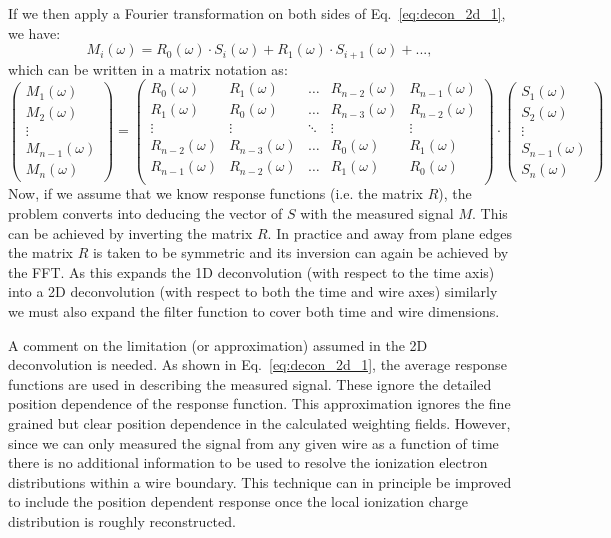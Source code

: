 If we then apply a Fourier transformation on both sides of Eq.~\ref{eq:decon_2d_1},
we have:
\begin{equation}\label{eq:decon_2d_2}
M_i(\omega) = R_0(\omega) \cdot S_i(\omega) + R_1(\omega) \cdot S_{i+1} (\omega) + ...,
\end{equation} 
which can be written in a matrix notation as:
\begin{equation}
\begin{pmatrix}
    M_1(\omega)\\
    M_2(\omega)\\
    \vdots\\
    M_{n-1}(\omega)\\
    M_{n}(\omega)
\end{pmatrix}
=
\begin{pmatrix}
R_0(\omega) & R_1(\omega) & \ldots & R_{n-2}(\omega) & R_{n-1}(\omega) \\
R_1(\omega) & R_0(\omega) & \ldots & R_{n-3}(\omega) & R_{n-2}(\omega) \\
    \vdots  & \vdots      & \ddots & \vdots          & \vdots \\
    R_{n-2}(\omega) & R_{n-3}(\omega) & \ldots & R_0(\omega) & R_1(\omega) \\
    R_{n-1}(\omega) & R_{n-2}(\omega) & \ldots & R_1(\omega) & R_0(\omega) \\
\end{pmatrix}
\cdot
\begin{pmatrix}
    S_1(\omega)\\
    S_2(\omega)\\
    \vdots\\
    S_{n-1}(\omega)\\
    S_{n}(\omega)
\end{pmatrix}
\label{eq:matrix_expansion}
\end{equation}
Now, if we assume that we know response functions (i.e. the matrix $R$), the 
problem converts into deducing the vector of $S$ with the measured signal $M$. 
%
This can be achieved by inverting the matrix $R$. In practice and away
from plane edges the matrix $R$ is taken to be symmetric and its
inversion can again be achieved by the FFT.
%
As this expands the 1D deconvolution (with respect to the time axis)
into a 2D deconvolution (with respect to both the time and wire
axes) similarly we must also expand the filter function to cover
both time and wire dimensions.

A comment on the limitation (or approximation) 
assumed in the 2D deconvolution is needed. As shown in Eq.~\ref{eq:decon_2d_1}, the 
average response functions are used in describing the measured signal. These 
ignore the detailed position dependence of the response function. 
This approximation ignores the fine grained but clear position
dependence in the calculated weighting fields.
However, since we can only measured the signal from any given wire as
a function of time there is no additional information to be used to
resolve the ionization electron distributions within a wire boundary.
This technique can in principle be improved to include the position dependent
response once the local ionization charge distribution is roughly reconstructed. 

